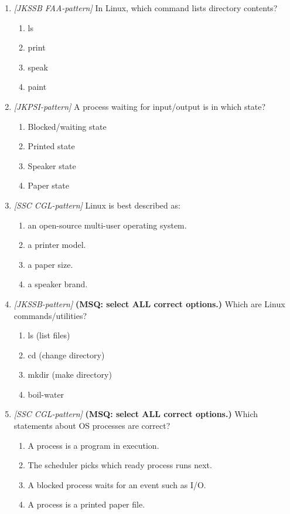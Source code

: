 \documentclass[11pt]{article}
\begin{document}
\begin{enumerate}[label=\textbf{Q\arabic*.}, leftmargin=*]
\item \textit{[JKSSB FAA-pattern]} In Linux, which command lists directory contents?
  \begin{enumerate}[label=\Alph*.]
    \item ls
    \item print
    \item speak
    \item paint
  \end{enumerate}
\item \textit{[JKPSI-pattern]} A process waiting for input/output is in which state?
  \begin{enumerate}[label=\Alph*.]
    \item Blocked/waiting state
    \item Printed state
    \item Speaker state
    \item Paper state
  \end{enumerate}
\item \textit{[SSC CGL-pattern]} Linux is best described as:
  \begin{enumerate}[label=\Alph*.]
    \item an open-source multi-user operating system.
    \item a printer model.
    \item a paper size.
    \item a speaker brand.
  \end{enumerate}
\item \textit{[JKSSB-pattern]} \textbf{(MSQ: select ALL correct options.)} Which are Linux commands/utilities?
  \begin{enumerate}[label=\Alph*.]
    \item ls (list files)
    \item cd (change directory)
    \item mkdir (make directory)
    \item boil-water
  \end{enumerate}
\item \textit{[SSC CGL-pattern]} \textbf{(MSQ: select ALL correct options.)} Which statements about OS processes are correct?
  \begin{enumerate}[label=\Alph*.]
    \item A process is a program in execution.
    \item The scheduler picks which ready process runs next.
    \item A blocked process waits for an event such as I/O.
    \item A process is a printed paper file.
  \end{enumerate}
\end{enumerate}
\def\JKSSBLessonID{60}\def\JKSSBAnswers{0}
\end{document}

